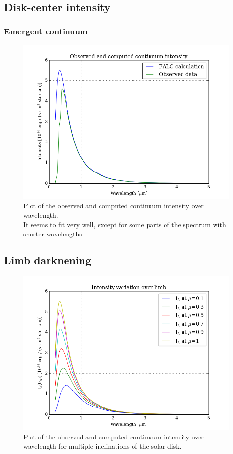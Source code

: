 \documentclass[11pt,a4paper,notitlepage]{article}
\begin{document}
\subsection{Disk-center intensity}
\subsubsection{Emergent continuum}
\begin{figure}[H]
\center
	\includegraphics[scale=0.42]{../figs/2disk_center_int.png}
	\caption{Plot of the observed and computed continuum intensity over wavelength.\\
	It seems to fit very well, except for some parts of the spectrum with shorter wavelengths.}
\end{figure}

\subsection{Limb darknening}
\begin{figure}[H]
\center
	\includegraphics[scale=0.42]{../figs/2disk_limbdark.png}
	\caption{Plot of the observed and computed continuum intensity over wavelength for multiple inclinations of the solar disk.}
\end{figure}
\end{document}
